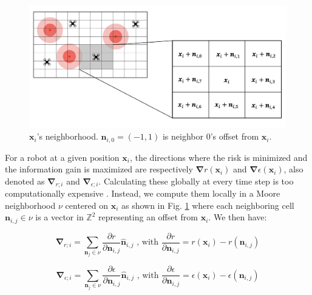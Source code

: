 \begin{figure}[h]
	\centering
    \includegraphics[width=0.95\columnwidth]{images/Moore.png}
    \caption{$\bm{x}_i$'s neighborhood. $\bm{n}_{i,0} = (-1, 1)$ is neighbor 0's offset from $\bm{x}_i$.}
    \label{neighborhood}
\end{figure}

For a robot at a given position $\bm{x}_i$, the directions where the
risk is minimized and the information gain is maximized are
respectively $\bm{\nabla}r(\bm{x}_i)$ and
$\bm{\nabla}\epsilon(\bm{x}_i)$, also denoted as $\bm{\nabla}_{r;i}$
and $\bm{\nabla}_{\epsilon;i}$. Calculating these globally at every
time step is too computationally expensive
\cite{dames2012decentralized,schwagerMultirobotControlPolicy2017}. Instead,
we compute them locally in a Moore neighborhood $\nu$ centered on
$\bm{x}_i$ as shown in Fig. \ref{neighborhood} where each neighboring
cell $\bm{n}_{i,j} \in \nu$ is a vector in $\mathbb{Z}^2$ representing
an offset from $\bm{x}_i$. We then have:

\begin{equation}
    \bm{\nabla}_{r;i} = \sum_{\bm{n}_j \in \nu}\frac{\partial r}{\partial \bm{n}_{i,j}} \bm{\hat{n}}_{i,j} \text{ , with } \frac{\partial r}{\partial \bm{n}_{i,j}} = r(\bm{x}_i) - r(\bm{n}_{i,j})
    \label{eq:gradient_risk}
\end{equation}

\begin{equation}
    \bm{\nabla}_{\epsilon;i} = \sum_{\bm{n}_j \in \nu}\frac{\partial \epsilon}{\partial \bm{n}_{i,j}} \bm{\hat{n}}_{i,j} \text{ , with } \frac{\partial \epsilon}{\partial \bm{n}_{i,j}} = \epsilon(\bm{x}_i) - \epsilon(\bm{n}_{i,j})
    \label{eq:gradient_exploration}
\end{equation}


